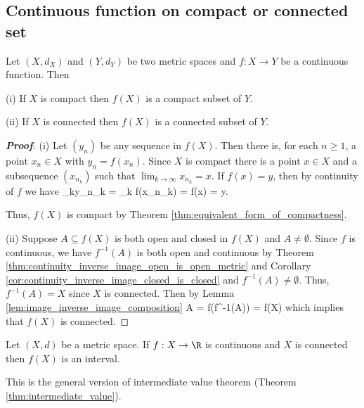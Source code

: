 \subsection{Continuous function on compact or connected set}

\begin{theorem}\label{thm:image_of_compact_or_connected_reserves_property}
Let $(X,d_X)$ and $(Y,d_Y)$ be two metric spaces and $f: X\to Y$ be a continuous function. Then
\ben
\item [(i)] If $X$ is compact then $f(X)$ is a compact subset of $Y$.
\item [(ii)] If $X$ is connected then $f(X)$ is a connected subset of $Y$.
\een
\end{theorem}

\begin{proof}[\bf Proof]%
\ben
\item [(i)] Let $(y_n)$ be any sequence in $f(X)$. Then there is, for each $n\geq 1$, a point $x_n\in X$ with $y_n = f(x_n)$. Since $X$ is compact there is a point $x\in X$ and a subsequence $(x_{n_k})$ such that $\lim_{k\to\infty} x_{n_k} = x$. If $f(x) = y$, then by continuity of $f$ we have
    \be
    \lim_{k\to\infty}y_{n_k} = \lim_{k\to \infty} f(x_{n_k}) = f(x) = y.
    \ee

    Thus, $f(X)$ is compact by Theorem \ref{thm:equivalent_form_of_compactness}.

\item [(ii)] Suppose $A\subseteq f(X)$ is both open and closed in $f(X)$ and $A\neq \emptyset$. Since $f$ is continuous, we have $f^{-1}(A)$ is both open and continuous by Theorem \ref{thm:continuity_inverse_image_open_is_open_metric} and Corollary \ref{cor:continuity_inverse_image_closed_is_closed} and $f^{-1}(A) \neq \emptyset$. Thus, $f^{-1}(A) = X$ since $X$ is connected. Then by Lemma \ref{lem:image_inverse_image_composition}
    \be
    A = f(f^{-1}(A)) = f(X)
    \ee
    which implies that $f(X)$ is connected.
\een
\end{proof}

\begin{corollary}
Let $(X,d)$ be a metric space. If $f:X\to \R$ is continuous and $X$ is connected then $f(X)$ is an interval.
\end{corollary}

\begin{remark}
This is the general version of intermediate value theorem (Theorem \ref{thm:intermediate_value}).
\end{remark}


